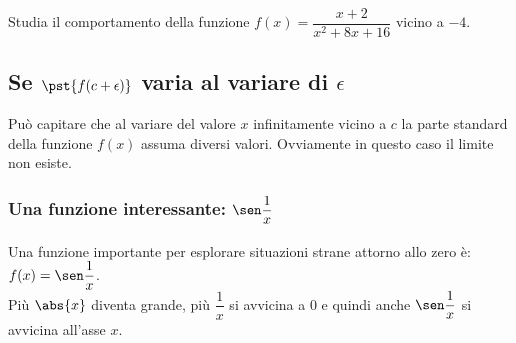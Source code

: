 \begin{esempio}
Studia il comportamento della funzione \(f(x)=\dfrac{x+2}{x^2+8x+16}\) 
vicino a \(-4\).

\end{esempio}

\subsection{Se \(\pst{f(c+\epsilon)}\) varia al variare di \(\epsilon\)}
\label{subsec:cont_limiti_nonsempreesiste}

Può capitare che al variare del valore \(x\) infinitamente vicino a \(c\) la 
parte standard della funzione \(f(x)\) assuma diversi valori. Ovviamente in 
questo caso il limite non esiste.

\subsubsection{Una funzione interessante: \(\sen \dfrac{1}{x}\)}

\noindent Una funzione importante per esplorare situazioni strane attorno 
allo zero è: \(f(x) = \sen \dfrac{1}{x}\).\\
Più \(\abs{x}\) diventa grande, più \(\dfrac{1}{x}\) si avvicina a \(0\) e 
quindi anche \(\sen \dfrac{1}{x}\) si avvicina all'asse \(x\).

